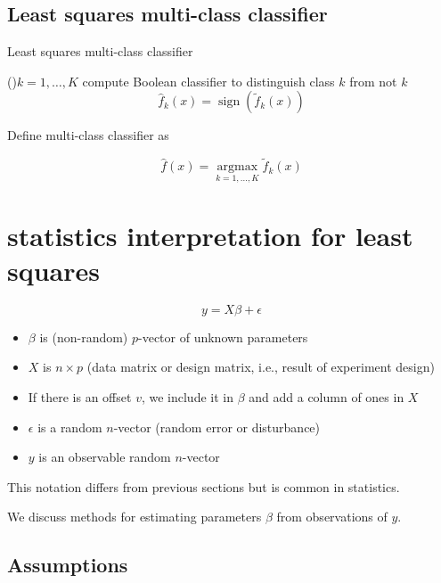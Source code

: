 \subsection{Least squares multi-class classifier}

\begin{algorithm}[htbp]
    \caption{Least squares multi-class classifier}
    \For(){$ k=1, \ldots, K $}{
        compute Boolean classifier to distinguish class $ k $ from not $ k $
$$
\hat{f}_{k}(x)=\operatorname{sign}\left(\tilde{f}_{k}(x)\right)
$$
    }
\end{algorithm}

Define multi-class classifier as

\begin{definition}
    $$
\hat{f}(x)=\underset{k=1, \ldots, K}{\operatorname{argmax}} \tilde{f}_{k}(x)
$$
\end{definition}



\section{statistics interpretation for least squares}

\begin{problem}
    $$
y=X \beta+\epsilon
$$

\begin{itemize}
    \item $ \beta $ is (non-random) $ p $-vector of unknown parameters
    \item $ X $ is $ n \times p $ (data matrix or design matrix, i.e., result of experiment design)
    \item If there is an offset $ v $, we include it in $ \beta $ and add a column of ones in $ X $
    \item $ \epsilon $ is a random $ n $-vector (random error or disturbance)
    \item $ y $ is an observable random $ n $-vector
\end{itemize}
\end{problem}

\begin{remark}
    This notation differs from previous sections but is common in statistics.
\end{remark}

We discuss methods for estimating parameters $ \beta $ from observations of $ y $.

\subsection{Assumptions}

